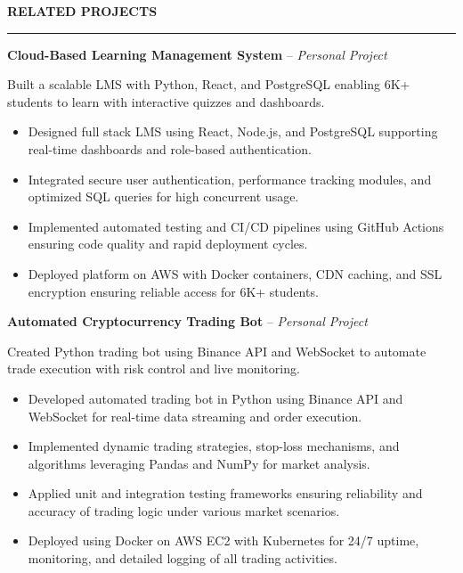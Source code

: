 \documentclass[10pt,letterpaper]{article}
\begin{document}
\vspace{6pt}

\textbf{RELATED PROJECTS}\\[-8pt]
\noindent\rule{\textwidth}{1pt}

\vspace{-2pt}

\textbf{Cloud-Based Learning Management System} -- \emph{Personal Project}

\vspace{-1pt}

Built a scalable LMS with Python, React, and PostgreSQL enabling 6K+ students to learn with interactive quizzes and dashboards.
\vspace{-1pt}
\begin{itemize}
\item Designed full stack LMS using React, Node.js, and PostgreSQL supporting real-time dashboards and role-based authentication.
\item Integrated secure user authentication, performance tracking modules, and optimized SQL queries for high concurrent usage.
\item Implemented automated testing and CI/CD pipelines using GitHub Actions ensuring code quality and rapid deployment cycles.
\item Deployed platform on AWS with Docker containers, CDN caching, and SSL encryption ensuring reliable access for 6K+ students.
\end{itemize}

\textbf{Automated Cryptocurrency Trading Bot} -- \emph{Personal Project}

\vspace{-1pt}

Created Python trading bot using Binance API and WebSocket to automate trade execution with risk control and live monitoring.
\vspace{-1pt}
\begin{itemize}
\item Developed automated trading bot in Python using Binance API and WebSocket for real-time data streaming and order execution.
\item Implemented dynamic trading strategies, stop-loss mechanisms, and algorithms leveraging Pandas and NumPy for market analysis.
\item Applied unit and integration testing frameworks ensuring reliability and accuracy of trading logic under various market scenarios.
\item Deployed using Docker on AWS EC2 with Kubernetes for 24/7 uptime, monitoring, and detailed logging of all trading activities.
\end{itemize}
\end{document}
